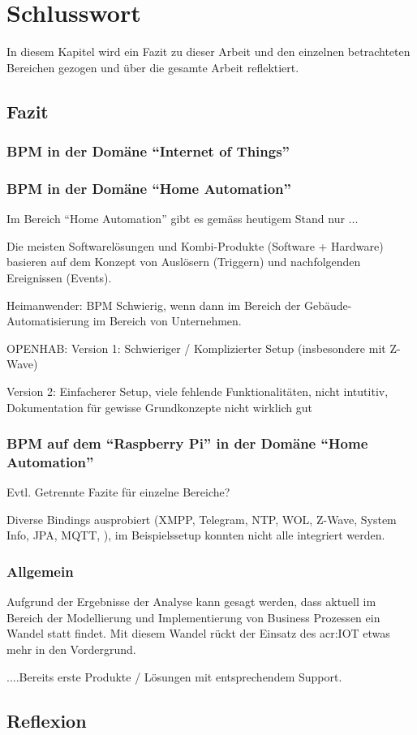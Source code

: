 
\chapter{Schlusswort} \label{chap:Finish}
In diesem Kapitel wird ein Fazit zu dieser Arbeit und den einzelnen betrachteten Bereichen gezogen und über die gesamte Arbeit reflektiert.
\section{Fazit}

\subsection{BPM in der Domäne "`Internet of Things"'}

\subsection{BPM in der Domäne "`Home Automation"'}
Im Bereich "`Home Automation"' gibt es gemäss heutigem Stand nur ...

Die meisten Softwarelösungen und Kombi-Produkte (Software + Hardware) basieren auf dem Konzept von Auslösern (Triggern) und nachfolgenden Ereignissen (Events).

Heimanwender: BPM Schwierig, wenn dann im Bereich der Gebäude-Automatisierung im Bereich von Unternehmen.


OPENHAB:
Version 1: Schwieriger / Komplizierter Setup (insbesondere mit Z-Wave)

Version 2: Einfacherer Setup, viele fehlende Funktionalitäten, nicht intutitiv, Dokumentation für gewisse Grundkonzepte nicht wirklich gut

\subsection{BPM auf dem "`Raspberry Pi"' in der Domäne "`Home Automation"'}
Evtl. Getrennte Fazite für einzelne Bereiche?

Diverse Bindings ausprobiert (XMPP, Telegram, NTP, WOL, Z-Wave, System Info, JPA, MQTT, ), im Beispielssetup konnten nicht alle integriert werden.

\subsection{Allgemein}
Aufgrund der Ergebnisse der Analyse kann gesagt werden, dass aktuell im Bereich der Modellierung und Implementierung von Business Prozessen ein Wandel statt findet. Mit diesem Wandel rückt der Einsatz des \gls{acr:IOT} etwas mehr in den Vordergrund. 

....Bereits erste Produkte / Lösungen mit entsprechendem Support.



\section{Reflexion}



